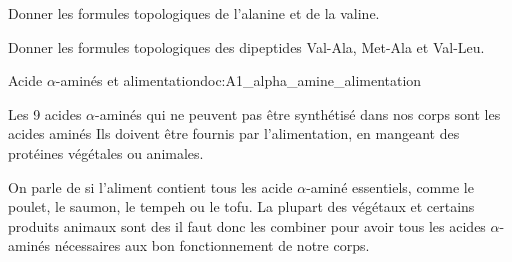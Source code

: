 \numeroQuestion
Donner les formules topologiques de l'alanine et de la valine.
\correction{
  \centering
  \chemfig{!\valine}  \qq{} \chemfig{!\alanine}
}
\pasCorrection{\vspace*{4cm}}

\numeroQuestion
Donner les formules topologiques des dipeptides Val-Ala, Met-Ala et Val-Leu.
\vfill

\begin{doc}{Acide $\alpha$-aminés et alimentation}{doc:A1_alpha_amine_alimentation}
  \begin{importants}
    Les 9 acides $\alpha$-aminés qui ne peuvent pas être synthétisé dans nos corps sont les acides aminés 
    Ils doivent être fournis par l'alimentation, en mangeant des protéines végétales ou animales.
  \end{importants}
  
  On parle de  si l'aliment contient tous les acide $\alpha$-aminé essentiels, comme le poulet, le saumon, le tempeh ou le tofu.
  La plupart des végétaux et certains produits animaux sont des  il faut donc les combiner pour avoir tous les acides $\alpha$-aminés nécessaires aux bon fonctionnement de notre corps.
\end{doc}